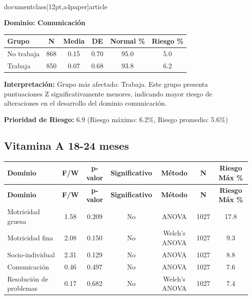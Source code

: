\\documentclass[12pt,a4paper]{article}
\begin{document}
\textbf{Dominio: Comunicación}


\begin{center}
\begin{tabular}{|l|c|c|c|c|c|}
\hline
\textbf{Grupo} & \textbf{N} & \textbf{Media} & \textbf{DE} & \textbf{Normal \%} & \textbf{Riesgo \%} \\
\hline
No trabaja & 868 & 0.15 & 0.70 & 95.0 & 5.0 \\
Trabaja & 850 & 0.07 & 0.68 & 93.8 & 6.2 \\

\hline
\end{tabular}
\end{center}


\textbf{Interpretación:} Grupo más afectado: Trabaja. Este grupo presenta puntuaciones Z significativamente menores, indicando mayor riesgo de alteraciones en el desarrollo del dominio comunicación.

\textbf{Prioridad de Riesgo:} 6.9 (Riesgo máximo: 6.2\%, Riesgo promedio: 5.6\%)


\vspace{0.5cm}


\subsection{Vitamina A 18-24 meses}


\begin{longtable}{|l|c|c|c|c|c|c|}
\hline
\textbf{Dominio} & \textbf{F/W} & \textbf{p-valor} & \textbf{Significativo} & \textbf{Método} & \textbf{N} & \textbf{Riesgo Máx \%} \\
\hline
\endfirsthead

\hline
\textbf{Dominio} & \textbf{F/W} & \textbf{p-valor} & \textbf{Significativo} & \textbf{Método} & \textbf{N} & \textbf{Riesgo Máx \%} \\
\hline
\endhead

\hline
\endfoot

\hline
\endlastfoot

Motricidad gruesa & 1.58 & 0.209 & No & ANOVA & 1027 & 17.8 \\
Motricidad fina & 2.08 & 0.150 & No & Welch's ANOVA & 1027 & 9.3 \\
Socio-individual & 2.31 & 0.129 & No & ANOVA & 1027 & 8.8 \\
Comunicación & 0.46 & 0.497 & No & ANOVA & 1027 & 7.6 \\
Resolución de problemas & 0.17 & 0.682 & No & Welch's ANOVA & 1027 & 7.4 \\

\end{longtable}
\end{document}
